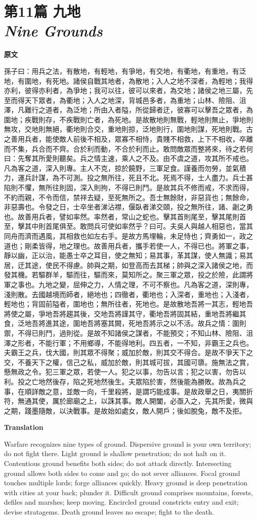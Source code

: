 \documentclass[12pt]{book}
\newcommand{\chapterentry}[4]{%
  \chapter[\texorpdfstring{#1}{#1}]{\texorpdfstring{#1\\\Large\textit{#2}}{#1 — #2}}%
  \noindent\textbf{原文}\par
  #3

  \bigskip
  \noindent\textbf{Translation}\par
  #4
}
\begin{document}
\chapterentry{第11篇 九地}{Nine Grounds}{%
孫子曰：用兵之法，有散地，有輕地，有爭地，有交地，有衢地，有重地，有泛地，有圍地，有死地。諸侯自戰其地者，為散地；入人之地不深者，為輕地；我得亦利，彼得亦利者，為爭地；我可以往，彼可以來者，為交地；諸侯之地三屬，先至而得天下眾者，為衢地；入人之地深，背城邑多者，為重地；山林、險阻、沮澤，凡難行之道者，為泛地；所由入者隘，所從歸者迂，彼寡可以擊吾之眾者，為圍地；疾戰則存，不疾戰則亡者，為死地。是故散地則無戰，輕地則無止，爭地則無攻，交地則無絕，衢地則合交，重地則掠，泛地則行，圍地則謀，死地則戰。古之善用兵者，能使敵人前後不相及，眾寡不相恃，貴賤不相救，上下不相收，卒離而不集，兵合而不齊。合於利而動，不合於利而止。敢問敵眾而整將來，待之若何曰：先奪其所愛則聽矣。兵之情主速，乘人之不及。由不虞之道，攻其所不戒也。凡為客之道，深入則專。主人不克，掠於饒野，三軍足食。謹養而勿勞，並氣積力，運兵計謀，為不可測。投之無所往，死且不北。死焉不得，士人盡力。兵士甚陷則不懼，無所往則固，深入則拘，不得已則鬥。是故其兵不修而戒，不求而得，不約而親，不令而信，禁祥去疑，至死無所之。吾士無餘財，非惡貨也；無餘命，非惡壽也。令發之日，士卒坐者涕沾襟，偃臥者涕交頤，投之無所往，諸、劌之勇也。故善用兵者，譬如率然。率然者，常山之蛇也。擊其首則尾至，擊其尾則首至，擊其中則首尾俱至。敢問兵可使如率然乎？曰可。夫吳人與越人相惡也，當其同舟而濟而遇風，其相救也如左右手。是故方馬埋輪，未足恃也；齊勇如一，政之道也；剛柔皆得，地之理也。故善用兵者，攜手若使一人，不得已也。將軍之事，靜以幽，正以治，能愚士卒之耳目，使之無知；易其事，革其謀，使人無識；易其居，迂其途，使民不得慮。帥與之期，如登高而去其梯；帥與之深入諸侯之地，而發其機。若驅群羊，驅而往，驅而來，莫知所之。聚三軍之眾，投之於險，此謂將軍之事也。九地之變，屈伸之力，人情之理，不可不察也。凡為客之道，深則專，淺則散。去國越境而師者，絕地也；四徹者，衢地也；入深者，重地也；入淺者，輕地也；背固前隘者，圍地也；無所往者，死地也。是故散地吾將一其志，輕地吾將使之屬，爭地吾將趨其後，交地吾將謹其守，衢地吾將固其結，重地吾將繼其食，泛地吾將進其途，圍地吾將塞其闕，死地吾將示之以不活。故兵之情：圍則禦，不得已則鬥，過則從。是故不知諸侯之謀者，不能預交；不知山林、險阻、沮澤之形者，不能行軍；不用鄉導，不能得地利。四五者，一不知，非霸王之兵也。夫霸王之兵，伐大國，則其眾不得聚；威加於敵，則其交不得合。是故不爭天下之交，不養天下之權，信己之私，威加於敵，則其城可拔，其國可隳。施無法之賞，懸無政之令。犯三軍之眾，若使一人。犯之以事，勿告以言；犯之以害，勿告以利。投之亡地然後存，陷之死地然後生。夫眾陷於害，然後能為勝敗。故為兵之事，在順詳敵之意，並敵一向，千里殺將，是謂巧能成事。是故政舉之日，夷關折符，無通其使，厲於廊廟之上，以誅其事。敵人開闔，必亟入之，先其所愛，微與之期，踐墨隨敵，以決戰事。是故始如處女，敵人開戶；後如脫兔，敵不及拒。}{%
Warfare recognizes nine types of ground. Dispersive ground is your own territory; do not fight there. Light ground is shallow penetration; do not halt on it. Contentious ground benefits both sides; do not attack directly. Intersecting ground allows both sides to come and go; do not sever alliances. Focal ground touches multiple lords; forge alliances quickly. Heavy ground is deep penetration with cities at your back; plunder it. Difficult ground comprises mountains, forests, defiles and marshes; keep moving. Encircled ground constricts entry and exit; devise stratagems. Death ground leaves no escape; fight to the death.

}
\end{document}
